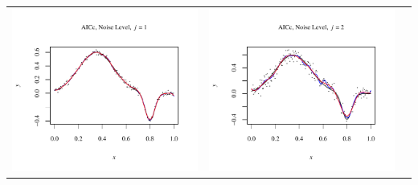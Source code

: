 \documentclass[11pt]{article}
\begin{document}
\begin{table}[h!]
  \begin{center}
    \renewcommand{\arraystretch}{1.5}
    \begin{tabular}{| >{\centering\arraybackslash}m{2.1in} |  >{\centering\arraybackslash}m{2.1in} |  >{\centering\arraybackslash}m{2.1in}|}
      \hline
      \includegraphics[width=1\linewidth,height=0.18\textheight]{Graphs/3/1/assignment5_a_3_1_1}&
      \includegraphics[width=1\linewidth,height=0.18\textheight]{Graphs/3/1/assignment5_a_3_1_2}&

\end{tabular}
\end{center}
\end{table}
\end{document}
